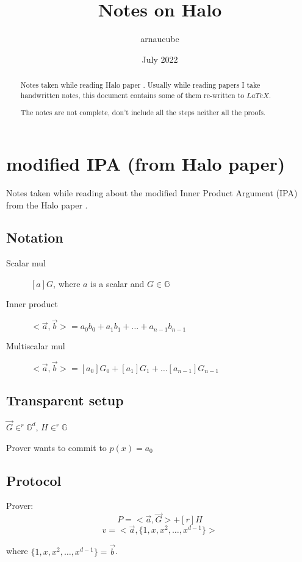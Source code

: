 \documentclass{article}
\title{Notes on Halo}
\author{arnaucube}
\date{July 2022}
\theoremstyle{definition}
\begin{document}
\maketitle

\begin{abstract}
	Notes taken while reading Halo paper \cite{cryptoeprint:2019/1021}. Usually while reading papers I take handwritten notes, this document contains some of them re-written to $LaTeX$.

	The notes are not complete, don't include all the steps neither all the proofs.
\end{abstract}

\tableofcontents

\section{modified IPA (from Halo paper)}
Notes taken while reading about the modified Inner Product Argument (IPA) from the Halo paper \cite{cryptoeprint:2019/1021}.

\subsection{Notation}
\begin{description}
    \item[Scalar mul] $[a]G$, where $a$ is a scalar and $G \in \mathbb{G}$
    \item[Inner product] $<\overrightarrow{a}, \overrightarrow{b}> = a_0 b_0 + a_1 b_1 + \ldots + a_{n-1} b_{n-1}$
    \item[Multiscalar mul] $<\overrightarrow{a}, \overrightarrow{b}> = [a_0] G_0 + [a_1] G_1 + \ldots [a_{n-1}] G_{n-1}$
\end{description}


\subsection{Transparent setup}
$\overrightarrow{G} \in^r \mathbb{G}^d$, $H \in^r \mathbb{G}$

Prover wants to commit to $p(x)=a_0$
\subsection{Protocol}
Prover:
$$P=<\overrightarrow{a}, \overrightarrow{G}> + [r]H$$
$$v=<\overrightarrow{a}, \{1, x, x^2, \ldots, x^{d-1} \} >$$

where $\{1, x, x^2, \ldots, x^{d-1} \} = \overrightarrow{b}$.
\end{document}

